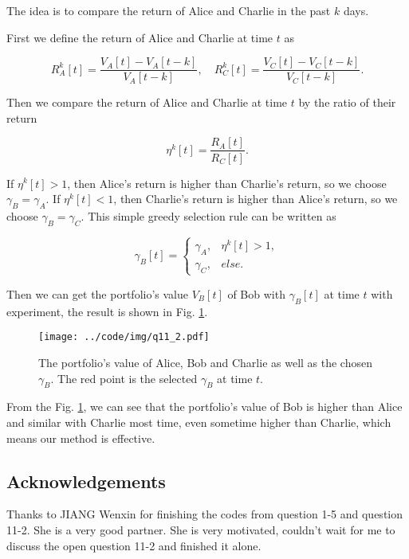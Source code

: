 \documentclass[runningheads]{llncs}
\begin{document}
The idea is to compare the return of Alice and Charlie in the past $k$ days.

First we define the return of Alice and Charlie at time $t$ as

\begin{equation}
    R_A^k[t]=\frac{V_A[t]-V_A[t-k]}{V_A[t-k]},\quad R_C^k[t]=\frac{V_C[t]-V_C[t-k]}{V_C[t-k]}.
\end{equation}

Then we compare the return of Alice and Charlie at time $t$ by the ratio of their return

\begin{equation}
    \eta^k[t]=\frac{R_A[t]}{R_C[t]}.
\end{equation}

If $\eta^k[t]>1$, then Alice's return is higher than Charlie's return, so we choose $\gamma_B=\gamma_A$.
If $\eta^k[t]<1$, then Charlie's return is higher than Alice's return, so we choose $\gamma_B=\gamma_C$.
This simple greedy selection rule can be written as 

\begin{equation}
    \gamma_B[t] =
    \begin{cases}
        \gamma_A, & \eta^k[t]>1, \\
        \gamma_C, & else.
    \end{cases}
\end{equation}

Then we can get the portfolio's value $V_B[t]$ of Bob with $\gamma_B[t]$ at time $t$ with experiment, the result is shown in Fig. \ref{fig:q11-2}.

\begin{figure}[!htbp]
    \begin{center}
        \texttt{[image: ../code/img/q11\_2.pdf]}
    \end{center}
    \caption{The portfolio's value of Alice, Bob and Charlie as well as the chosen $\gamma_B$. The red point is the selected $\gamma_B$ at time $t$.}
    \label{fig:q11-2}
\end{figure}

From the Fig. \ref{fig:q11-2}, we can see that the portfolio's value of Bob is higher than Alice and similar with Charlie most time, even sometime higher than Charlie, which means our method is effective.

\newpage



\subsection*{Acknowledgements} 

Thanks to JIANG Wenxin for finishing the codes from question 1-5 and question 11-2.
She is a very good partner. She is very motivated, couldn't wait for me to discuss the open question 11-2 and finished it alone.
\end{document}

